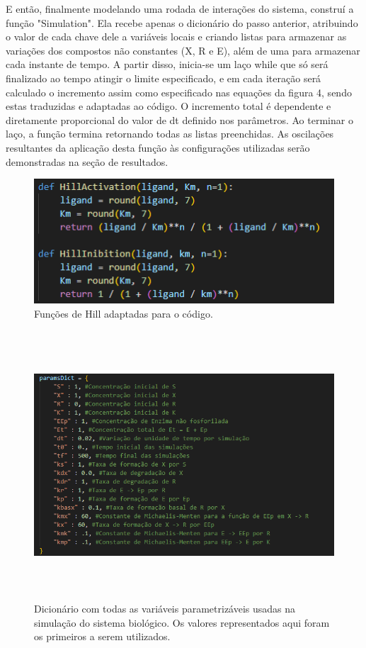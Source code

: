 \documentclass[brazilian,12pt,a4paper,final]{article}
\begin{document}
	E então, finalmente modelando uma rodada de interações do sistema, construí a função "Simulation". Ela recebe apenas o dicionário do passo anterior, atribuindo o valor de cada chave dele a variáveis locais e criando listas para armazenar as variações dos compostos não constantes (X, R e E), além de uma para armazenar cada instante de tempo. A partir disso, inicia-se um laço while que só será finalizado ao tempo atingir o limite especificado, e em cada iteração será calculado o incremento assim como especificado nas equações da figura 4, sendo estas traduzidas e adaptadas ao código. O incremento total é dependente e diretamente proporcional do valor de dt definido nos parâmetros. Ao terminar o laço, a função termina retornando todas as listas preenchidas.
	As oscilações resultantes da aplicação desta função às configurações utilizadas serão demonstradas na seção de resultados.
	
	\begin{figure}[hbtp]
		\begin{center}
			\includegraphics[width=14cm]{Hill.png}
			\caption{Funções de Hill adaptadas para o código.}
			\label{fig}
		\end{center}
	\end{figure}
	
	\begin{figure}[hbtp]
		\begin{center}
			\includegraphics[height=10cm, width=14cm]{dict.png}
			\caption{Dicionário com todas as variáveis parametrizáveis usadas na simulação do sistema biológico. Os valores representados aqui foram os primeiros a serem utilizados.}
			\label{fig}
		\end{center}
	\end{figure}
	
\end{document}

